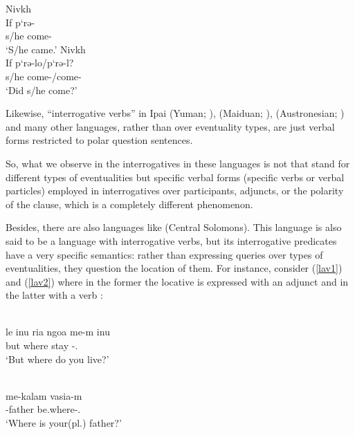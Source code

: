 \documentclass[output=paper]{langsci/langscibook}
\begin{document}
\begin{exe}
\ex\label{nivkh1} Nivkh\\
    \gll If	p‘rə-\\
            s/he come-\Ind{}\\
            \glt `S/he came.'
\ex\label{nivkh2} Nivkh\\
    \gll If	p‘rə-lo/p‘rə-l?\\
            s/he come-\glossQ{}/come-\glossQ{} \\
            \glt `Did s/he come?'
\end{exe}
%


Likewise, ``interrogative verbs'' in Ipai (Yuman; \citealt{langdon1966}),
 (Maiduan; \citealt{shipley1964}),  (Austronesian;
\citealt{lindstrom.lynch1994}) and many other languages, rather than
 over eventuality types, are just verbal forms restricted to
polar question sentences.

So, what we observe in the interrogatives in these languages is not
 that stand for different types of eventualities but specific
verbal forms (specific verbs or verbal particles) employed in interrogatives
over participants, adjuncts, or the polarity of the clause, which is a
completely different phenomenon.

Besides, there are also languages like  (Central Solomons). This
language is also said to be a language with interrogative verbs, but its
interrogative predicates have a very specific semantics: rather than expressing
queries over types of eventualities, they question the location of them. For
instance, consider (\ref{lav1}) and (\ref{lav2}) where in the former the
locative is expressed with an adjunct and in the latter with a verb
\citep[from][457 and 460]{terrill2003}:

\begin{exe}
\ex \label{lav1} \\
\gll le inu ria ngoa me-m inu\\
but \Ssg{} where stay \Hab{}-\Sg.\M{} \Ssg{}\\
\glt `But where do you live?'

\ex \label{lav2} \\
\gll me-kalam vasia-m\\
\Spl{}-father be.where-\Sg.\M{}\\
\glt `Where is your(pl.) father?'
\end{exe}
\end{document}

